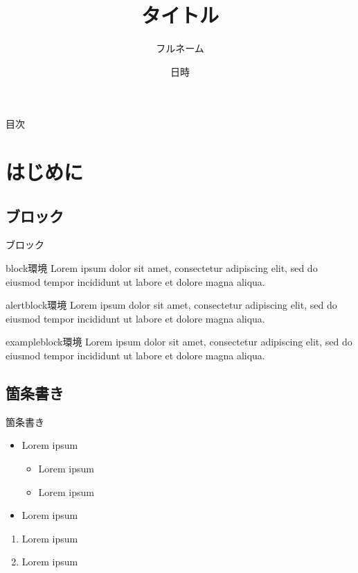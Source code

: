 \documentclass[unicode]{beamer}
\title{タイトル}
\author[名字とか]{フルネーム}
\date{日時}
\begin{document}
  {\maketitle}


  \begin{frame}{目次}
    \tableofcontents
  \end{frame}


  \section{はじめに}
  \subsection{ブロック}
  \begin{frame}{ブロック}
    \begin{block}{block環境}
      Lorem ipsum dolor sit amet, consectetur adipiscing elit, sed do eiusmod tempor incididunt ut labore et dolore magna aliqua.
    \end{block}
    \begin{alertblock}{alertblock環境}
      Lorem ipsum dolor sit amet, consectetur adipiscing elit, sed do eiusmod tempor incididunt ut labore et dolore magna aliqua.
    \end{alertblock}
    \begin{exampleblock}{exampleblock環境}
      Lorem ipsum dolor sit amet, consectetur adipiscing elit, sed do eiusmod tempor incididunt ut labore et dolore magna aliqua.
    \end{exampleblock}
  \end{frame}


  \subsection{箇条書き}
  \begin{frame}{箇条書き}
    \begin{itemize}
      \item Lorem ipsum
      \begin{itemize}
        \item Lorem ipsum
        \item Lorem ipsum
      \end{itemize}
      \item Lorem ipsum
    \end{itemize}
    \begin{enumerate}
      \item Lorem ipsum
      \item Lorem ipsum
    \end{enumerate}
  \end{frame}
\end{document}
